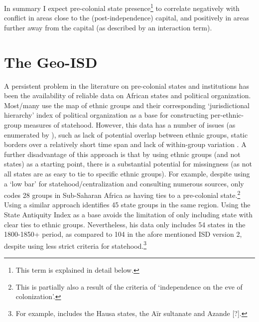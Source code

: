 \documentclass[12pt]{article}
\begin{document}
In summary I expect pre-colonial state presence\footnote{This term is explained
in detail below.} to correlate negatively with conflict in areas close to the
(post-independence) capital, and positively in areas further away from the
capital (as described by an interaction term).

\section{The Geo-ISD}

A persistent problem in the literature on pre-colonial states and institutions
has been the availability of reliable data on African states and political
organization. Most/many use the \citet{Murdock1967} map of ethnic groups and
their corresponding `jurisdictional hierarchy' index of political organization
as a base for constructing per-ethnic-group measures of statehood. However, this
data has a number of issues (as enumerated by \citet{Michalopoulos2018}), such
as lack of potential overlap between ethnic groups, static borders over a
relatively short time span and lack of within-group variation
\citep{Michalopoulos2018}. A further disadvantage of this approach is that by
using ethnic groups (and not states) as a starting point, there is a substantial
potential for missingness (as not all states are as easy to tie to specific
ethnic groups). For example, \citet{Paine2019} despite using a `low bar' for
statehood/centralization and consulting numerous sources, only codes 28 groups
in Sub-Saharan Africa as having ties to a pre-colonial state.\footnote{This is
partially also a result of the criteria of `independence on the eve of
colonization'.} Using a similar approach \citet{Wig2016} identifies 45 state
groups in the same region. Using the State Antiquity Index
\citep{Bockstette2012} as a base \citet{Depetris-Chauvin2016} avoids the
limitation of only including state with clear ties to ethnic groups.
Nevertheless, his data only includes 54 states in the 1800-1850+ period, as
compared to 104 in the afore mentioned ISD version 2, despite using less
strict criteria for statehood.\footnote{For example,
\citet{Depetris-Chauvin2016} includes the Hausa states, the Aïr sultanate and
Azande [?].}

\end{document}
